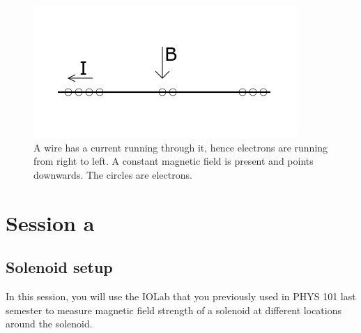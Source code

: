 \documentclass[12pt]{report}
\begin{document}
\begin{enumerate}
\begin{figure}[h]
\centering
\includegraphics[scale=0.85]{lab3-wire-bfield-force}
\caption{A wire has a current running through it, hence electrons are running from right to left. A constant magnetic field is present and points downwards. The circles are electrons.}
\end{figure}

\end{enumerate}

\section{Session a}
\subsection{Solenoid setup}
In this session, you will use the IOLab that you previously used in PHYS 101 last semester to measure magnetic field strength of a solenoid at different locations around the solenoid.
\end{document}
